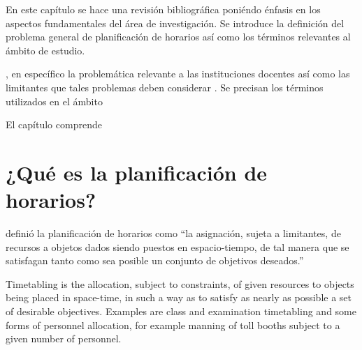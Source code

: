 \documentclass[draft,12pt,headsepline,footsepline,paper=letter]{scrreprt}
\begin{document}
En este capítulo se hace una revisión bibliográfica poniéndo énfasis en los aspectos fundamentales del área de investigación. Se introduce la definición del problema general de planificación de horarios así como los términos relevantes al ámbito de estudio. 

, en específico la problemática relevante a las instituciones docentes así como las limitantes que tales problemas deben considerar \citep[p.~8]{abdullah06heuristic-approaches}. Se precisan los términos utilizados en el ámbito

El capítulo comprende 

\section{¿Qué es la planificación de horarios?}

\citet[p.~53]{wren95scheduling-timetabling} definió la planificación de horarios como “la asignación, sujeta a limitantes, de recursos a objetos dados siendo puestos en espacio-tiempo, de tal manera que se satisfagan tanto como sea posible un conjunto de objetivos deseados.”

\iffalse
Timetabling is the allocation, subject to constraints, of given resources to objects being placed in space-time, in such a way as to satisfy as nearly as possible a set of desirable objectives. Examples are class and examination timetabling and some forms of personnel allocation, for example manning of toll booths subject to a given number of personnel.
\end{document}
